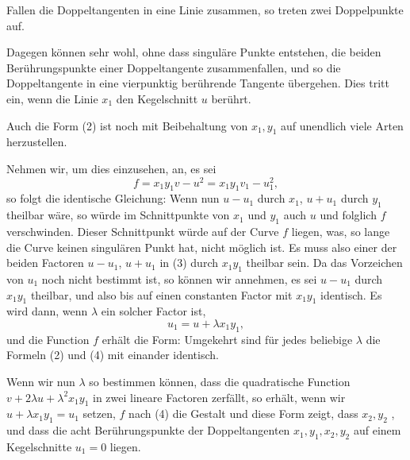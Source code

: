 Fallen die Doppeltangenten in eine Linie zusammen, so treten zwei Doppelpunkte auf.

Dagegen können sehr wohl, ohne dass singuläre Punkte entstehen, die beiden Berührungspunkte einer Doppeltangente zusammenfallen, und so die Doppeltangente in eine vierpunktig berührende Tangente übergehen. Dies tritt ein, wenn die Linie $x_1$ den Kegelschnitt $u$ berührt.

Auch die Form (2) ist noch mit Beibehaltung von $x_1, y_1$ auf unendlich viele Arten herzustellen.

Nehmen wir, um dies einzusehen, an, es sei
\[
f = x_1 y_1 v - u^2 = x_1 y_1 v_1 - u_1^2,
\]
so folgt die identische Gleichung:
Wenn nun $u - u_1$ durch $x_1$, $u + u_1$ durch $y_1$ theilbar wäre, so würde im Schnittpunkte von $x_1$ und $y_1$ auch $u$ und folglich $f$ verschwinden. Dieser Schnittpunkt würde auf der Curve $f$ liegen, was, so lange die Curve keinen singulären Punkt hat, nicht möglich ist. Es muss also einer der beiden Factoren $u - u_1$, $u + u_1$ in (3) durch $x_1 y_1$ theilbar sein. Da das Vorzeichen von $u_1$ noch nicht bestimmt ist, so können wir annehmen, es sei $u - u_1$ durch $x_1 y_1$ theilbar, und also bis auf einen constanten Factor mit $x_1 y_1$ identisch. Es wird dann, wenn $\lambda$ ein solcher Factor ist,
\[
u_1 = u + \lambda x_1 y_1,
\]
und die Function $f$ erhält die Form:
Umgekehrt sind für jedes beliebige $\lambda$ die Formeln (2) und (4) mit einander identisch.

Wenn wir nun $\lambda$ so bestimmen können, dass die quadratische Function $v + 2\lambda u + \lambda^2 x_1 y_1$ in zwei lineare Factoren zerfällt, so erhält, wenn wir $u + \lambda x_1 y_1 = u_1$ setzen, $f$ nach (4) die Gestalt
und diese Form zeigt, dass $x_2, y_2$ , und dass die acht Berührungspunkte der Doppeltangenten $x_1, y_1, x_2, y_2$ auf einem Kegelschnitte $u_1 = 0$ liegen.
